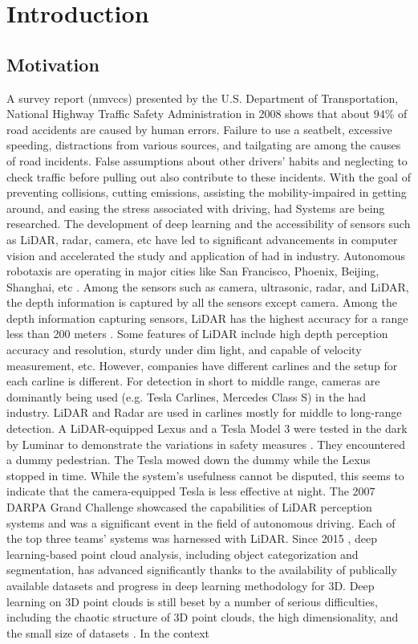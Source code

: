 \chapter{Introduction}

\section{Motivation}
A survey report (\acrshort{nmvccs}) presented by the  U.S. Department of Transportation, National Highway Traffic Safety Administration in 2008 \parencite{nmvccs} shows that about \(94\%\) of road accidents are caused by human errors. Failure to use a seatbelt, excessive speeding, distractions from various sources, and tailgating are among the causes of road incidents. False assumptions about other drivers' habits and neglecting to check traffic before pulling out also contribute to these incidents. With the goal of preventing collisions, cutting emissions, assisting the mobility-impaired in getting around, and easing the stress associated with driving, \acrfull{had} Systems are being researched. The development of deep learning and the accessibility of sensors such as LiDAR, radar, camera, etc have led to significant advancements in computer vision and accelerated the study and application of \acrshort{had} in industry. Autonomous robotaxis are operating in major cities like San Francisco, Phoenix, Beijing, Shanghai, etc \parencite{robotaxis}. Among the sensors such as camera, ultrasonic, radar, and LiDAR, the depth information is captured by all the sensors except camera. Among the depth information capturing sensors, LiDAR has the highest accuracy for a range less than 200 meters \parencite{Yurtsever_2020}. Some features of LiDAR include high depth perception accuracy and resolution, sturdy under dim light, and capable of velocity measurement, etc. However, companies have different carlines and the setup for each carline is different. For detection in short to middle range, cameras are dominantly being used (e.g. Tesla Carlines, Mercedes Class S) in the \acrshort{had} industry. LiDAR and Radar are used in carlines mostly for middle to long-range detection. A LiDAR-equipped Lexus and a Tesla Model 3 were tested in the dark by Luminar to demonstrate the variations in safety measures \parencite{tesla_vs_lexus}. They encountered a dummy pedestrian. The Tesla mowed down the dummy while the Lexus stopped in time. While the system's usefulness cannot be disputed, this seems to indicate that the camera-equipped Tesla is less effective at night. The 2007 DARPA Grand Challenge showcased the capabilities of LiDAR perception systems and was a significant event in the field of autonomous driving. Each of the top three teams' systems was harnessed with LiDAR. Since 2015 \parencite{guo2020deep}, deep learning-based point cloud analysis, including object categorization and segmentation, has advanced significantly thanks to the availability of publically available datasets and progress in deep learning methodology for 3D. Deep learning on 3D point clouds is still beset by a number of serious difficulties, including the chaotic structure of 3D point clouds, the high dimensionality, and the small size of datasets \parencite{qi2017pointnet}. In the context 